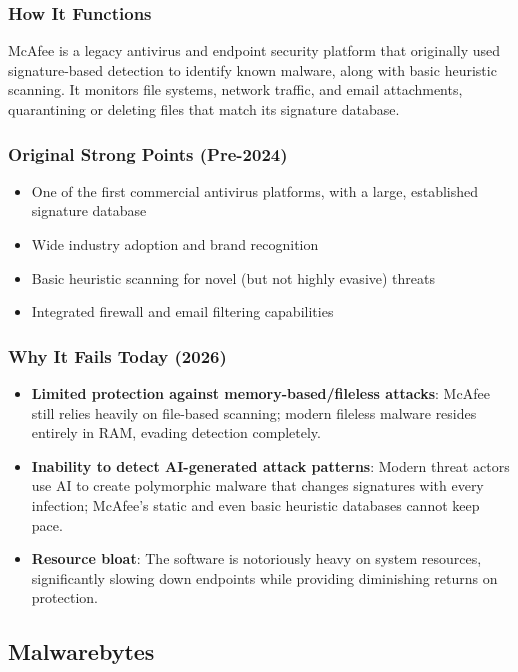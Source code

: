 \documentclass[12pt,letterpaper]{report}
\begin{document}
\subsubsection{How It Functions}
McAfee is a legacy antivirus and endpoint security platform that originally used signature-based detection to identify known malware, along with basic heuristic scanning. It monitors file systems, network traffic, and email attachments, quarantining or deleting files that match its signature database.

\subsubsection{Original Strong Points (Pre-2024)}
\begin{itemize}
    \item One of the first commercial antivirus platforms, with a large, established signature database
    \item Wide industry adoption and brand recognition
    \item Basic heuristic scanning for novel (but not highly evasive) threats
    \item Integrated firewall and email filtering capabilities
\end{itemize}

\subsubsection{Why It Fails Today (2026)}
\begin{itemize}
    \item \textbf{Limited protection against memory-based/fileless attacks}: McAfee still relies heavily on file-based scanning; modern fileless malware resides entirely in RAM, evading detection completely.
    \item \textbf{Inability to detect AI-generated attack patterns}: Modern threat actors use AI to create polymorphic malware that changes signatures with every infection; McAfee's static and even basic heuristic databases cannot keep pace.
    \item \textbf{Resource bloat}: The software is notoriously heavy on system resources, significantly slowing down endpoints while providing diminishing returns on protection.
\end{itemize}

\subsection{Malwarebytes}
\end{document}
